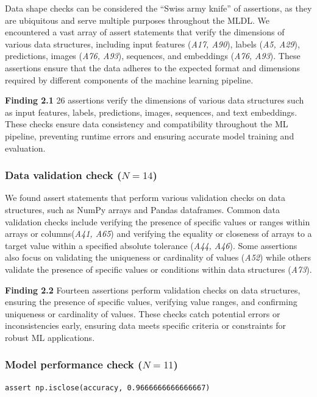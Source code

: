 \documentclass[smallextended]{svjour3}       %
\newcommand{\highlight}[1]{\begin{framed}%
  \noindent#1
\end{framed}}
\begin{document}
Data shape checks can be considered the ``Swiss army knife'' of assertions, as they are ubiquitous and serve multiple purposes throughout the MLDL. We encountered a vast array of assert statements that verify the dimensions of various data structures, including input features (\emph{A17, A90}), labels (\emph{A5, A29}), predictions, images (\emph{A76, A93}), sequences, and embeddings (\emph{A76, A93}). These assertions ensure that the data adheres to the expected format and dimensions required by different components of the machine learning pipeline.

\highlight{\textbf{Finding 2.1} 26 assertions verify the dimensions of various data structures such as input features, labels, predictions, images, sequences, and text embeddings. These checks ensure data consistency and compatibility throughout the ML pipeline, preventing runtime errors and ensuring accurate model training and evaluation.}

\subsubsection{Data validation check ($N = 14$)}

We found assert statements that perform various validation checks on data structures, such as NumPy arrays and Pandas dataframes. Common data validation checks include verifying the presence of specific values or ranges within arrays or columns(\emph{A41, A65}) and verifying the equality or closeness of arrays to a target value within a specified absolute tolerance (\emph{A44, A46}). Some assertions also focus on validating the uniqueness or cardinality of values (\emph{A52}) while others validate the presence of specific values or conditions within data structures (\emph{A73}).

\highlight{\textbf{Finding 2.2} Fourteen assertions perform validation checks on data structures, ensuring the presence of specific values, verifying value ranges, and confirming uniqueness or cardinality of values. These checks catch potential errors or inconsistencies early, ensuring data meets specific criteria or constraints for robust ML applications.}

\subsubsection{Model performance check ($N = 11$)}\label{sec:assert-model-perf}

\begin{lstlisting}[caption={Assertion \emph{A58} used to check that the accuracy of a model is close to the specified value. The use of \lstinline{np.isclose} allows for small deviations in the accuracy thus accounting for the stochastic nature of ML models.}, label={lst:A58}]
assert np.isclose(accuracy, 0.9666666666666667)
\end{lstlisting}
\end{document}
